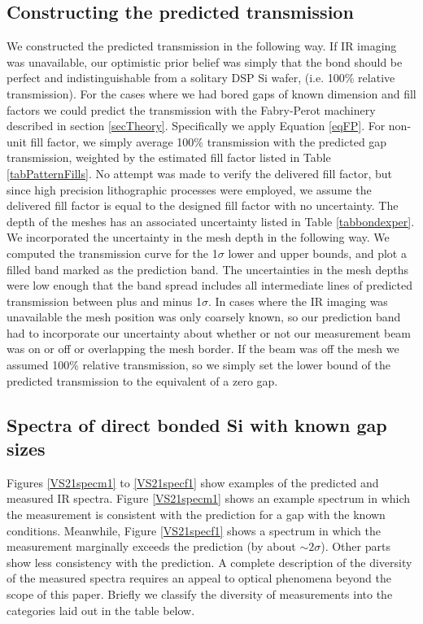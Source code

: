 \documentclass[osajnl,preprint,showpacs,superscriptaddress,12pt]{revtex4-1} %
\begin{document}
\subsection{Constructing the predicted transmission}
We constructed the predicted transmission in the following way.  If IR imaging was unavailable, our optimistic prior belief was simply that the bond should be perfect and indistinguishable from a solitary DSP Si wafer, (i.e. 100\% relative transmission).  For the cases where we had bored gaps of known dimension and fill factors we could predict the transmission with the Fabry-Perot machinery described in section \ref{secTheory}.  Specifically we apply Equation \ref{eqFP}.  For non-unit fill factor, we simply average 100\% transmission with the predicted gap transmission, weighted by the estimated fill factor listed in Table \ref{tabPatternFills}.  No attempt was made to verify the delivered fill factor, but since high precision lithographic processes were employed, we assume the delivered fill factor is equal to the designed fill factor with no uncertainty.  The depth of the meshes has an associated uncertainty listed in Table \ref{tabbondexper}.  We incorporated the uncertainty in the mesh depth in the following way.  We computed the transmission curve for the 1$\sigma$ lower and upper bounds, and plot a filled band marked as the prediction band.  The uncertainties in the mesh depths were low enough that the band spread includes all intermediate lines of predicted transmission between plus and minus 1$\sigma$.  In cases where the IR imaging was unavailable the mesh position was only coarsely known, so our prediction band had to incorporate our uncertainty about whether or not our measurement beam was on or off or overlapping the mesh border.  If the beam was off the mesh we assumed 100\% relative transmission, so we simply set the lower bound of the predicted transmission to the equivalent of a zero gap.  

\subsection{Spectra of direct bonded Si with known gap sizes}
Figures \ref{VS21specm1} to \ref{VS21specf1} show examples of the predicted and measured IR spectra.  Figure \ref{VS21specm1} shows an example spectrum in which the measurement is consistent with the prediction for a gap with the known conditions.  Meanwhile, Figure \ref{VS21specf1} shows a spectrum in which the measurement marginally exceeds the prediction (by about $\sim 2 \sigma$).  Other parts show less consistency with the prediction.  A complete description of the diversity of the measured spectra requires an appeal to optical phenomena beyond the scope of this paper.  Briefly we classify the diversity of measurements into the categories laid out in the table below.  
\end{document}
